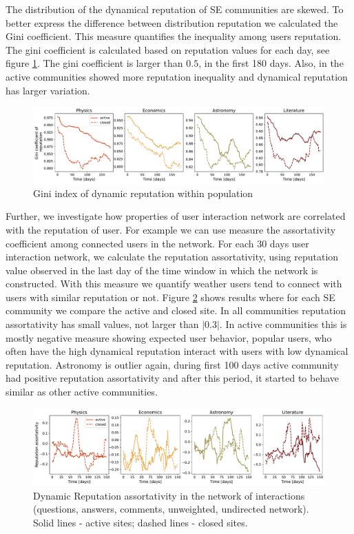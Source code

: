 The distribution of the dynamical reputation of SE communities are skewed. To better express the difference between distribution reputation we calculated the Gini coefficient. This measure quantifies the inequality among users reputation. The gini coefficient is calculated based on reputation values for each day, see figure \ref{fig:dynrep-gini}. The gini coefficient is larger than $0.5$, in the first 180 days. Also, in the active communities showed more reputation inequality and dynamical reputation has larger variation. 

\begin{figure}[h]
	\centering
	\includegraphics[width=1\linewidth]{figures/stackexchange/gini.pdf}
	\caption{Gini index of dynamic reputation within population}
	\label{fig:dynrep-gini}
\end{figure} 

Further, we investigate how properties of user interaction network are correlated with the reputation of user. For example we can use measure the assortativity coefficient among connected users in the network. For each 30 days user interaction network, we calculate the reputation assortativity, using reputation value observed in the last day of the time window in which the network is constructed. With this measure we quantify weather users tend to connect with users with similar reputation or not. Figure \ref{fig:dyn_rep_assort} shows results where for each SE community we compare the active and closed site. In all communities reputation assortativity has small values, not larger than $|0.3|$. In active communities this is mostly negative measure showing expected user behavior, popular users, who often have the high dynamical reputation interact with users with low dynamical reputation. Astronomy is outlier again, during first 100 days active community had positive reputation assortativity and after this period, it started to behave similar as other active communities. 

\begin{figure}[h]
	\centering
	\includegraphics[width=1\linewidth]{figures/stackexchange/reputation_assortativity.pdf}
	\caption{Dynamic Reputation assortativity in the network of interactions (questions, answers, comments, unweighted, undirected network). Solid lines - active sites; dashed lines - closed sites.}
	\label{fig:dyn_rep_assort}
\end{figure}

